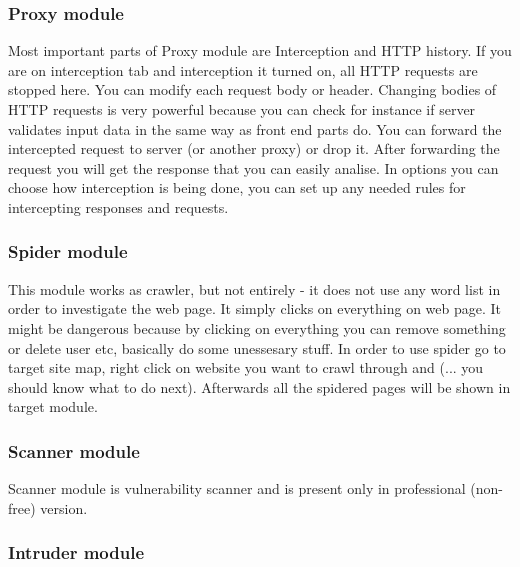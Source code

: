 \subsubsection{Proxy module}
Most important parts of Proxy module are Interception and HTTP history.
If you are on interception tab and interception it turned on, all HTTP requests are stopped here.
You can modify each request body or header.
Changing bodies of HTTP requests is very powerful because you can check for instance if server validates input data in the same way as front end parts do.
You can forward the intercepted request to server (or another proxy) or drop it.
After forwarding the request you will get the response that you can easily analise.
In options you can choose how interception is being done, you can set up any needed rules for intercepting responses and requests.

\subsubsection{Spider module}
This module works as crawler, but not entirely - it does not use any word list in order to investigate the web page.
It simply clicks on everything on web page.
It might be dangerous because by clicking on everything you can remove something or delete user etc, basically do some unessesary stuff.
In order to use spider go to target site map, right click on website you want to crawl through and (... you should know what to do next).
Afterwards all the spidered pages will be shown in target module.


\subsubsection{Scanner module}

Scanner module is vulnerability scanner and is present only in professional (non-free) version.

\subsubsection{Intruder module}

